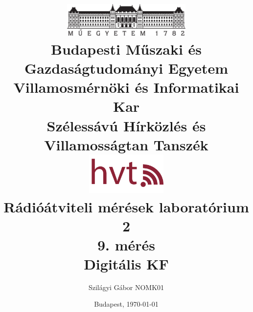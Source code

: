 \frenchspacing
\pagestyle{plain} 


\title{
    \centering
    \includegraphics[width=0.48\textwidth]{kep/bme_logo.pdf} \\
    \vspace{0.5cm}
    \large{\bf Budapesti Műszaki és Gazdaságtudományi Egyetem \\
    Villamosmérnöki és Informatikai Kar \\
    Szélessávú Hírközlés és Villamosságtan Tanszék}\\
    \vspace{0.5cm}
    \includegraphics[width=0.3\textwidth]{kep/hvt_logo.png} \\
    \vspace{3cm}
    \large{Rádióátviteli mérések laboratórium 2} \\
    \vspace{2cm}
    \Large{\bf{9. mérés\\Digitális KF}} \\
    \vspace{2cm}
}



\author{Szilágyi Gábor \hspace{1cm} NOMK01}
\date{Budapest, \today}



%
\maketitle
\setcounter{page}{2}
